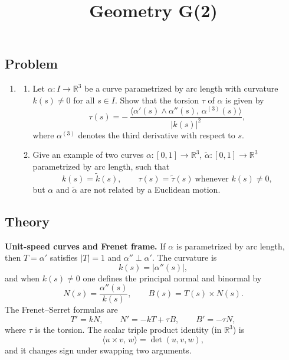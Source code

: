 \documentclass[12pt,a4paper]{article}
\title{Geometry G(2)}
\author{}
\date{}
\theoremstyle{plain}
\theoremstyle{definition}      %
\begin{document}
	\maketitle
	
\subsection*{Problem}
\begin{enumerate}[label=\textbf{\arabic*.}]
	\item
	\begin{enumerate}[label=\textbf{(\roman*)}]
		\item Let $\alpha:I\to\mathbb{R}^3$ be a curve parametrized by arc length with curvature $k(s)\neq 0$ for all $s\in I$.
		Show that the torsion $\tau$ of $\alpha$ is given by
		\[
		\tau(s)=-\,\frac{\big\langle \alpha'(s)\wedge \alpha''(s),\,\alpha^{(3)}(s)\big\rangle}{|k(s)|^2},
		\]
		where $\alpha^{(3)}$ denotes the third derivative with respect to $s$.
		
		\item Give an example of two curves $\alpha:[0,1]\to\mathbb{R}^3$, $\tilde\alpha:[0,1]\to\mathbb{R}^3$ parametrized by arc length, such that
		\[
		k(s)=\tilde k(s),\qquad \tau(s)=\tilde\tau(s)\ \text{whenever }k(s)\neq 0,
		\]
		but $\alpha$ and $\tilde\alpha$ are not related by a Euclidean motion.
	\end{enumerate}
\end{enumerate}

\subsection*{Theory}
\noindent\textbf{Unit-speed curves and Frenet frame.}
If $\alpha$ is parametrized by arc length, then $T=\alpha'$ satisfies $|T|=1$ and $\alpha''\perp \alpha'$.
The curvature is
\[
k(s)=|\alpha''(s)|,
\]
and when $k(s)\neq 0$ one defines the principal normal and binormal by
\[
N(s)=\frac{\alpha''(s)}{k(s)},\qquad B(s)=T(s)\times N(s).
\]
The Frenet--Serret formulas are
\[
T'=kN,\qquad N'=-kT+\tau B,\qquad B'=-\tau N,
\]
where $\tau$ is the torsion. The scalar triple product identity (in $\mathbb R^3$) is
\[
\langle u\times v,\,w\rangle=\det(u,v,w),
\]
and it changes sign under swapping two arguments.
\end{document}

